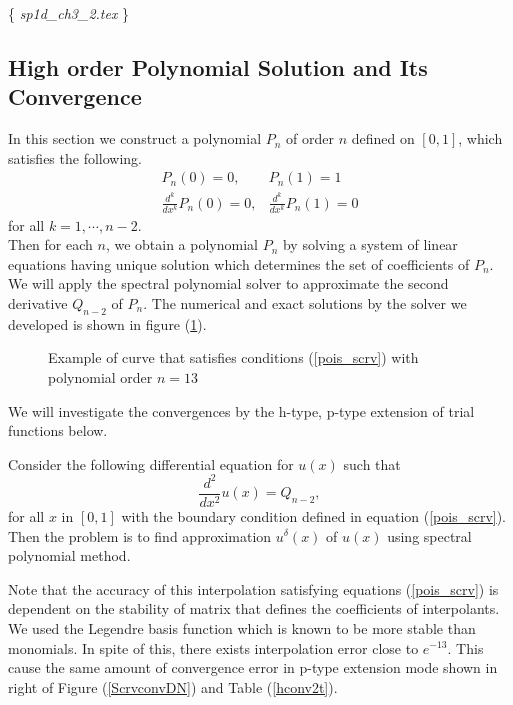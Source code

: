\{ {\it  sp1d\_ch3\_2.tex} \}

\subsection {High order Polynomial Solution and Its Convergence}

In this section we construct a polynomial $P_n$ of order $n$ defined on $[0,1]$, which satisfies the following.
\begin{eqnarray}
\label{pois_scrv}
    P_n(0) = 0, &P_n(1) = 1 \\
    \frac{d^k}{dx^k}P_n(0) = 0, &\frac{d^k}{dx^k}P_n(1) = 0
\end{eqnarray}
for all $k = 1, \cdots, n-2$. \\
Then for each $n$, we obtain a polynomial $P_n$ by solving a system of linear equations having unique solution which determines the set of coefficients of $P_n$. We will apply the spectral polynomial solver to approximate the second derivative $Q_{n-2}$ of $P_n$.
The numerical and exact solutions by the solver we developed is shown in figure (\ref{scrvsol}).


\begin{figure}[h]
    \begin{center}
    \caption{\label{scrvsol}Example of curve that satisfies conditions (\ref{pois_scrv}) with polynomial order $n=13$}
    \end{center}
\end{figure}
We will investigate the convergences by the h-type, p-type extension of trial functions below.

\begin{problem}
Consider the following differential equation for $u(x)$ such that
\begin{equation}
\label{poi_poly}
    \frac{d^2}{dx^2} u(x) = Q_{n-2},
\end{equation}
for all $x$ in $[0, 1]$ with the boundary condition defined in equation (\ref{pois_scrv}). Then the problem is to find approximation $u^{\delta}(x)$ of $u(x)$ using spectral polynomial method.
\end{problem}

Note that the accuracy of this interpolation satisfying equations (\ref{pois_scrv}) is dependent on the stability of matrix that defines the coefficients of interpolants. We used the Legendre basis function which is known to be more stable than monomials. In spite of this, there exists interpolation error close to $e^{-13}$. This cause the same amount of convergence error in p-type extension mode shown in right of Figure (\ref{ScrvconvDN}) and Table (\ref{hconv2t}).

